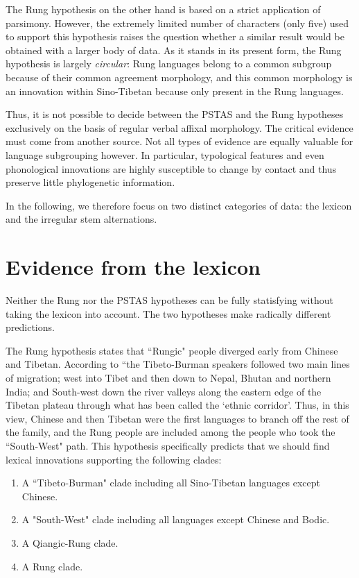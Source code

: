 \documentclass[oldfontcommands,oneside,a4paper,11pt]{article}
\begin{document}
The Rung hypothesis  on the other hand is based on a strict application of parsimony. However, the extremely limited number of characters (only five) used to support this hypothesis raises the question whether a similar result would be obtained with a larger body of data. As it stands in its present form, the Rung hypothesis is largely \textit{circular}: Rung languages belong to a common subgroup because of their common agreement morphology, and this common morphology is an innovation within Sino-Tibetan because only present in the Rung languages. 

Thus, it is not possible to decide between  the PSTAS and the Rung hypotheses exclusively on the basis of regular verbal affixal morphology. The critical evidence must come from another source. Not all types of evidence are equally valuable for language subgrouping however. In particular, typological features and even phonological innovations are highly susceptible to change by contact and thus preserve little phylogenetic information.

In  the following, we therefore focus on two distinct categories of data: the lexicon and the   irregular stem alternations.
 

\section{Evidence from the lexicon}
Neither the Rung   nor the PSTAS hypotheses can be fully statisfying without taking the lexicon into account. The two hypotheses make radically different predictions. 

The Rung hypothesis states that ``Rungic" people diverged early from Chinese and Tibetan. According to \citet[236]{lapolla01migration}  ``the Tibeto-Burman speakers followed two main lines of migration; west into Tibet and then down to Nepal, Bhutan and northern India; and South-west down the river valleys along the eastern edge of the Tibetan plateau through what has been called the `ethnic corridor'. Thus, in this view, Chinese and then Tibetan were the first languages to branch off the rest of the family, and the Rung people are included among the people who took the ``South-West" path. This hypothesis specifically predicts that we should find lexical innovations supporting the following clades:

\begin{enumerate}
\item  A ``Tibeto-Burman" clade including all Sino-Tibetan languages except Chinese.
\item A "South-West" clade including all languages except Chinese and Bodic.
\item A Qiangic-Rung clade.
\item A Rung clade.
\end{enumerate}
\end{document}
